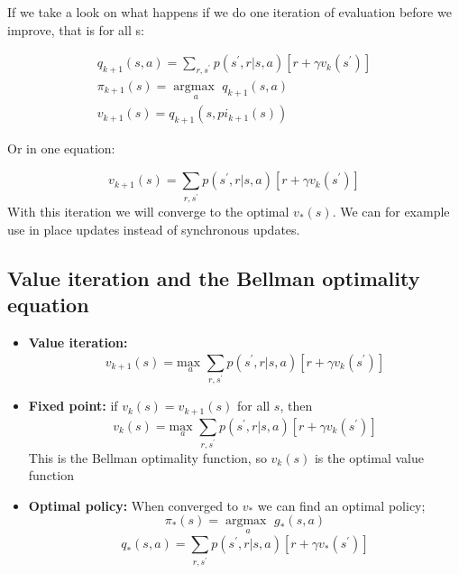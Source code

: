 If we take a look on what happens if we do one iteration of evaluation before we improve, that is for all s:

	\begin{equation}
	\begin{aligned}
		q_{k+1}(s,a) = \sum_{r, s^{\prime}}^{}p(s^{\prime},r|s,a)[r + \gamma v_k(s^{\prime})] \\
		\pi_{k+1}(s) = \underset{a}{\arg \text{max }} q_{k+1}(s,a) \\
		v_{k+1}(s) = q_{k+1}(s, pi_{k+1}(s))
	\end{aligned}
	\end{equation}

Or in one equation:

	\begin{equation}
		v_{k+1}(s) = \sum_{r, s^{\prime}}^{}p(s^{\prime},r|s,a)[r + \gamma v_k(s^{\prime})]
	\end{equation}
With this iteration we will converge to the optimal $v_*(s)$. We can for example use in place updates instead of synchronous updates. 


\subsection*{Value iteration and the Bellman optimality equation}

\begin{itemize}
	\item \textbf{Value iteration:} 
		\begin{equation}
			v_{k+1}(s) = \underset{a}{\text{max }}\sum_{r, s^{\prime}}^{}p(s^{\prime},r|s,a)[r + \gamma v_k(s^{\prime})]
		\end{equation}
	\item \textbf{Fixed point: } if $v_k(s) = v_{k+1}(s)$ for all $s$, then
		\begin{equation}
			v_{k}(s) = \underset{a}{\text{max }}\sum_{r, s^{\prime}}^{}p(s^{\prime},r|s,a)[r + \gamma v_k(s^{\prime})]
		\end{equation}
		This is the Bellman optimality function, so $v_k(s)$ is the optimal value function
	\item \textbf{Optimal policy: } When converged to $v_*$ we can find an optimal policy;
		\begin{equation}
			\pi_*(s) = \underset{a}{\arg \text{max }} g_*(s,a)
		\end{equation}
		\begin{equation}
			q_* (s,a) = \sum_{r, s^{\prime}}^{}p(s^{\prime},r|s,a)[r+\gamma v_*(s^{\prime})] 
		\end{equation}
\end{itemize}


